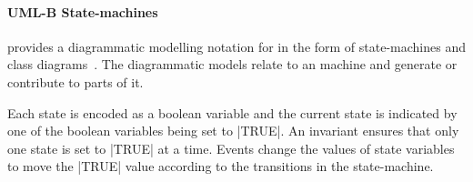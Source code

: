 

\paragraph{UML-B State-machines} provides a diagrammatic modelling notation for \EventB in the form of state-machines and class diagrams~\cite{said15:umlbSosym,snook14:iumlbStatem,snook06umlbTosem}.
The diagrammatic models relate to an \EventB machine and generate or contribute to parts of it.


Each state is encoded as a boolean variable and the current state is indicated by one of the boolean variables being set to |TRUE|.
An invariant ensures that only one state is set to |TRUE| at a time.
Events change the values of state variables to move the |TRUE| value according to the transitions in the state-machine.

